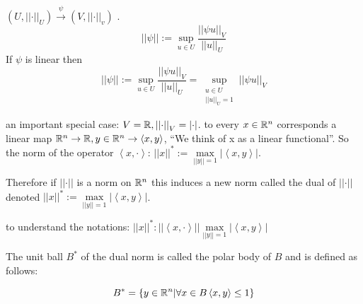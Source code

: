 \begin{definition}
 $\left(U,\left|\left|\cdot\right|\right|_{U}\right)\overset{\psi}{\to}\left(V,\left|\left|\cdot\right|\right|_{v}\right)$
. 
\[
\left|\left|\psi\right|\right|:=\sup_{u\in U}\frac{\left|\left|\psi u\right|\right|_{V}}{\left|\left|u\right|\right|_{U}}
\]
 If $\psi$ is linear then 
\[
\left|\left|\psi\right|\right|:=\sup_{u\in U}\frac{\left|\left|\psi u\right|\right|_{V}}{\left|\left|u\right|\right|_{U}}=\sup_{\begin{array}{c}
u\in U\\
\left|\left|u\right|\right|_{U}=1
\end{array}}\left|\left|\psi u\right|\right|_{V}
\]
 
\end{definition}

an important special case: $V=\mathbb{R},\left|\left|\cdot\right|\right|_{V}=\left|\cdot\right|$.
to every $x\in\mathbb{R}^{n}$ corresponds a linear map $\mathbb{R}^{n}\to\mathbb{R},y\in\mathbb{R}^{n}\to\left\langle x,y\right\rangle $,
``We think of x as a linear functional''. So the norm of the operator
$\left\langle x,\cdot\right\rangle $: $\left|\left|x\right|\right|^{*}:=\max\limits _{\left|\left|y\right|\right|=1}\left|\left\langle x,y\right\rangle \right|$.%
\begin{insight}
Therefore if $\left|\left|\cdot\right|\right|$ is a norm on $\mathbb{R}^{n}$
this induces a new norm called the dual of $\left|\left|\cdot\right|\right|$
denoted $\left|\left|x\right|\right|^{*}:=\max\limits _{\left|\left|y\right|\right|=1}\left|\left\langle x,y\right\rangle \right|$.%
\end{insight}
\begin{insight}
to understand the notations: $\left|\left|x\right|\right|^{*}:\left|\left|\left\langle x,\cdot\right\rangle \right|\right|\max\limits _{\left|\left|y\right|\right|=1}\left|\left\langle x,y\right\rangle \right|$%
\end{insight}
{} 
\begin{definition}
The unit ball $B^{*}$ of the dual norm is called the polar body of
$B$ and is defined as follows:

\[
B^{*}=\left\{ y\in\mathbb{R}^{n}|\forall x\in B\left\langle x,y\right\rangle \le1\right\} 
\]
\end{definition}

